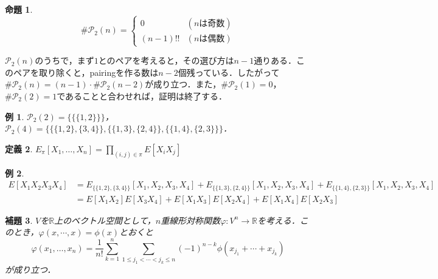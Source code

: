 \documentclass{ltjsarticle}
\makeatletter
\theoremstyle{mystyle1}
\newtheorem{dfn}{定義}[section]
\newtheorem{prop}[dfn]{命題}
\newtheorem{lem}[dfn]{補題}
\theoremstyle{mystyle2}
\newtheorem{example}{例}
\theoremstyle{mystyle3}
\renewenvironment{proof}[1][\proofname]{\par
  \pushQED{\qed}%
  \normalfont
  \topsep6\p@\@plus6\p@ \trivlist
  \item[\hskip\labelsep{\bfseries\sffamily #1}]\ignorespaces
}{%
  \popQED\endtrivlist\@endpefalse
}
\renewcommand\proofname{証明}
\makeatother
\begin{document}
\begin{prop}
    \begin{equation}
        \#\mathcal{P}_2(n)=\begin{cases}
            0       & (nは奇数) \\
            (n-1)!! & (nは偶数)
        \end{cases}
    \end{equation}
\end{prop}

\begin{proof}
    $\mathcal{P}_2(n)$のうちで，まず$1$とのペアを考えると，その選び方は$n-1$通りある．このペアを取り除くと，pairingを作る数は$n-2$個残っている．したがって$\#\mathcal{P}_2(n)=(n-1)\cdot\#\mathcal{P}_2(n-2)$が成り立つ．また，$\#\mathcal{P}_2(1)=0$，$\#\mathcal{P}_2(2)=1$であることと合わせれば，証明は終了する．
\end{proof}

\begin{example}
    $\mathcal{P}_2(2)=\{\{\{1,2\}\}\}$，$\mathcal{P}_2(4)=\{\{\{1,2\},\{3,4\}\},\{\{1,3\},\{2,4\}\},\{\{1,4\},\{2,3\}\}\}$．
\end{example}

\begin{dfn}
    $E_\pi [X_1,\ldots,X_n]=\prod_{(i,j)\in\pi}E[X_iX_j]$
\end{dfn}

\begin{example}
    \begin{equation}
        \begin{split}
            E[X_1X_2X_3X_4] & =E_{\{\{1,2\},\{3,4\}\}}[X_1,X_2,X_3,X_4]+E_{\{\{1,3\},\{2,4\}\}}[X_1,X_2,X_3,X_4]+E_{\{\{1,4\},\{2,3\}\}}[X_1,X_2,X_3,X_4] \\
            & =E[X_1X_2]E[X_3X_4]+E[X_1X_3]E[X_2X_4]+E[X_1X_4]E[X_2X_3]
        \end{split}
    \end{equation}
\end{example}

\begin{lem}
    $V$を$\mathbb{R}$上のベクトル空間として，$n$重線形対称関数$\varphi:V^n\to\mathbb{R}$を考える．このとき，$\varphi(x,\cdots,x)=\phi(x)$とおくと
    \begin{equation}
        \varphi(x_1,\ldots,x_n)=\frac{1}{n!}\sum_{k=1}^n\sum_{1\leq j_1<\cdots<j_k\leq n}(-1)^{n-k}\phi(x_{j_1}+\cdots+x_{j_k})
    \end{equation}
    が成り立つ．
\end{lem}
\end{document}
